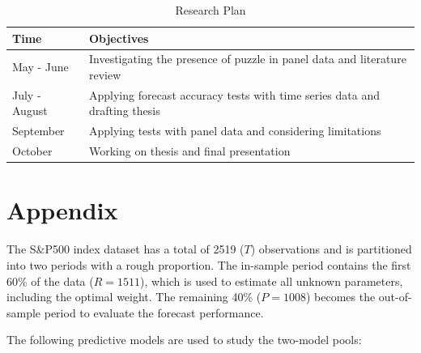 \documentclass{monashthesis}
\begin{document}
\begin{table}[htbp]
  \centering
  \caption{Research Plan}
    \begin{tabular}{ll}
    Time  & Objectives \\
    \midrule
    May - June & Investigating the presence of puzzle in panel data and literature review \\
    July - August & Applying forecast accuracy tests with time series data and drafting thesis  \\
    September & Applying tests with panel data and considering limitations \\
    October & Working on thesis and final presentation \\
    \end{tabular}
\end{table}

\appendix

\hypertarget{appendix}{%
\chapter{Appendix}\label{appendix}}

The S\&P500 index dataset has a total of 2519 (\(T\)) observations and is partitioned into two periods with a rough proportion. The in-sample period contains the first 60\% of the data (\(R = 1511\)), which is used to estimate all unknown parameters, including the optimal weight. The remaining 40\% (\(P = 1008\)) becomes the out-of-sample period to evaluate the forecast performance.

The following predictive models are used to study the two-model pools:
\end{document}
